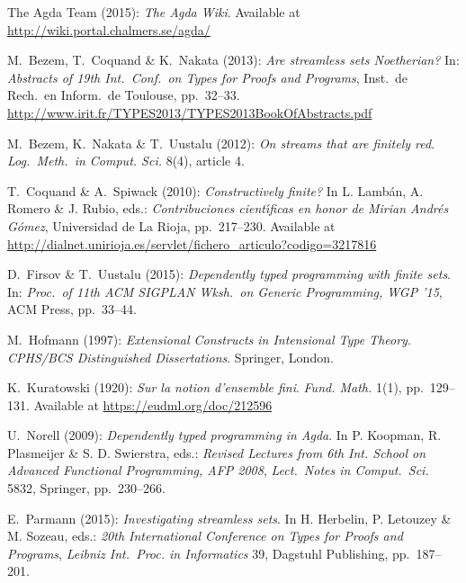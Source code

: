 \documentclass{eptcs}
\begin{document}

\begin{thebibliography}{20}

 The Agda Team (2015):
\newblock \textsl{The Agda Wiki}. Available at \url{http://wiki.portal.chalmers.se/agda/}

 M.~Bezem, T.~Coquand \& K.~Nakata (2013):
\newblock \emph{Are streamless sets Noetherian?}
\newblock In: \textsl{Abstracts of 19th Int.\ Conf.\ on Types for Proofs and Programs}, Inst.\ de Rech.\ en Inform.\ de Toulouse, pp.~32--33. \url{http://www.irit.fr/TYPES2013/TYPES2013BookOfAbstracts.pdf}

 M.~Bezem, K.~Nakata \& T.~Uustalu (2012):
\newblock \emph{On streams that are finitely red}.
\newblock \textsl{Log.\ Meth.\ in Comput. Sci.} 8(4), article 4.



 T.~Coquand \& A.~Spiwack (2010):
\newblock \emph{Constructively finite?}
\newblock In L. Lamb\'an, A. Romero \& J. Rubio, eds.:
\textsl{Contribuciones cient{\'\i}ficas en honor de Mirian Andr{\'e}s
    G{\'o}mez}, Universidad de La Rioja, pp.~217--230.
Available at \url{http://dialnet.unirioja.es/servlet/fichero_articulo?codigo=3217816}

 D.~Firsov \& T.~Uustalu (2015):
\newblock \emph{Dependently typed programming with finite sets}.
\newblock In: \textsl{Proc.\ of 11th ACM SIGPLAN Wksh.\ on Generic Programming, WGP
  '15}, ACM Press, pp.~33--44. 

 M.~Hofmann (1997):
\newblock \emph{Extensional Constructs in Intensional Type Theory}.
\newblock \textsl{CPHS/BCS Distinguished Dissertations}. Springer, London.

 K.~Kuratowski (1920):
\newblock \emph{Sur la notion d'ensemble fini}. 
\newblock \textsl{Fund. Math.} 1(1), pp.~129--131.
Available at \url{https://eudml.org/doc/212596}

 U.~Norell (2009):
\newblock \emph{Dependently typed programming in Agda}.
\newblock In P. Koopman, R. Plasmeijer \& S. D. Swierstra, eds.: \textsl{Revised Lectures from 6th Int. School on Advanced Functional Programming, AFP 2008}, \textsl{Lect.\ Notes in Comput.\ Sci.} 5832, Springer, pp.~230--266.

 E.~Parmann (2015):
\newblock \emph{Investigating streamless sets}.
\newblock In H. Herbelin, P. Letouzey \& M. Sozeau, eds.: \textsl{20th International Conference on Types for Proofs and Programs}, \textsl{Leibniz Int.\ Proc. in Informatics} 39, Dagstuhl Publishing, pp.~187--201.


\end{thebibliography}
\end{document}
